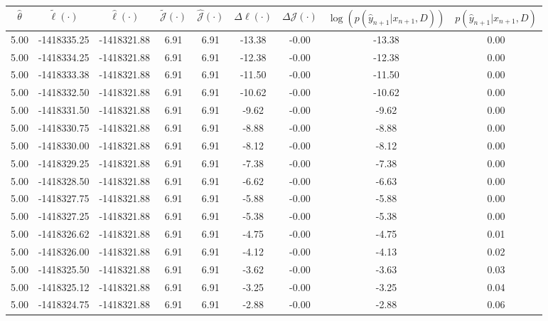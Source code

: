 \begin{table}[htbp]
        \centering
        \tiny
        \begin{adjustbox}{angle=90}
            \begin{tabular}{|c|c|c|c|c|c|c|c|c|}
                \hline
                 $\hat{\theta}$ & $\tilde{\ell}(\cdot)$ & $\hat{\ell}(\cdot)$ & $\tilde{\mathcal{J}}(\cdot)$ & $\hat{\mathcal{J}}(\cdot)$ & $\Delta \ell(\cdot)$ & $\Delta \mathcal{J}(\cdot)$ & $\log(p(\hat{y}_{n+1}|x_{n+1}, D))$ & $p(\hat{y}_{n+1}|x_{n+1}, D)$ \\
                \hline
                 5.00 & -1418335.25 & -1418321.88 & 6.91 & 6.91 & -13.38 & -0.00 & -13.38 & 0.00\\ \hline
 5.00 & -1418334.25 & -1418321.88 & 6.91 & 6.91 & -12.38 & -0.00 & -12.38 & 0.00\\ \hline
 5.00 & -1418333.38 & -1418321.88 & 6.91 & 6.91 & -11.50 & -0.00 & -11.50 & 0.00\\ \hline
 5.00 & -1418332.50 & -1418321.88 & 6.91 & 6.91 & -10.62 & -0.00 & -10.62 & 0.00\\ \hline
 5.00 & -1418331.50 & -1418321.88 & 6.91 & 6.91 & -9.62 & -0.00 & -9.62 & 0.00\\ \hline
 5.00 & -1418330.75 & -1418321.88 & 6.91 & 6.91 & -8.88 & -0.00 & -8.88 & 0.00\\ \hline
 5.00 & -1418330.00 & -1418321.88 & 6.91 & 6.91 & -8.12 & -0.00 & -8.12 & 0.00\\ \hline
 5.00 & -1418329.25 & -1418321.88 & 6.91 & 6.91 & -7.38 & -0.00 & -7.38 & 0.00\\ \hline
 5.00 & -1418328.50 & -1418321.88 & 6.91 & 6.91 & -6.62 & -0.00 & -6.63 & 0.00\\ \hline
 5.00 & -1418327.75 & -1418321.88 & 6.91 & 6.91 & -5.88 & -0.00 & -5.88 & 0.00\\ \hline
 5.00 & -1418327.25 & -1418321.88 & 6.91 & 6.91 & -5.38 & -0.00 & -5.38 & 0.00\\ \hline
 5.00 & -1418326.62 & -1418321.88 & 6.91 & 6.91 & -4.75 & -0.00 & -4.75 & 0.01\\ \hline
 5.00 & -1418326.00 & -1418321.88 & 6.91 & 6.91 & -4.12 & -0.00 & -4.13 & 0.02\\ \hline
 5.00 & -1418325.50 & -1418321.88 & 6.91 & 6.91 & -3.62 & -0.00 & -3.63 & 0.03\\ \hline
 5.00 & -1418325.12 & -1418321.88 & 6.91 & 6.91 & -3.25 & -0.00 & -3.25 & 0.04\\ \hline
 5.00 & -1418324.75 & -1418321.88 & 6.91 & 6.91 & -2.88 & -0.00 & -2.88 & 0.06\\ \hline

\end{tabular}
\end{adjustbox}
\end{table}
